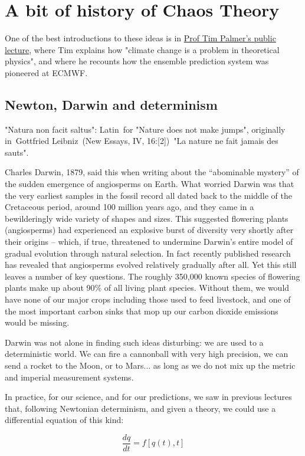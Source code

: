 \section{A bit of history of Chaos Theory}
One of the best introductions to these ideas is in \href{https://www.youtube.com/watch?v=w-IHJbzRVVU}{Prof Tim Palmer's public lecture}, where Tim explains how "climate change is a problem in theoretical physics", and where he recounts how the ensemble prediction system was pioneered at ECMWF.


\subsection{Newton, Darwin and determinism}
"Natura non facit saltus": Latin for "Nature does not make jumps", originally in Gottfried Leibniz (New Essays, IV, 16:[2]) "La nature ne fait jamais des sauts".

Charles Darwin, 1879, said this when writing about the “abominable mystery” of the sudden emergence of angiosperms on Earth.
What worried Darwin was that the very earliest samples in the fossil record all dated back to the middle of the Cretaceous period, around 100 million years ago, and they came in a bewilderingly wide variety of shapes and sizes. This suggested flowering plants (angiosperms) had experienced an explosive burst of diversity very shortly after their origins – which, if true, threatened to undermine Darwin's entire model of gradual evolution through natural selection.
In fact recently published research has revealed that angiosperms evolved relatively gradually after all. Yet this still leaves a number of key questions. The roughly 350,000 known species of flowering plants make up about 90\% of all living plant species. Without them, we would have none of our major crops including those used to feed livestock, and one of the most important carbon sinks that mop up our carbon dioxide emissions would be missing. 

Darwin was not alone in finding such ideas disturbing: we are used to a deterministic world. We can fire a cannonball with very high precision, we can send a rocket to the Moon, or to Mars... as long as we do not mix up the metric and imperial measurement systems.

In practice, for our science, and for our predictions, we saw in previous lectures that, following Newtonian determinism, and given a theory, we could use a differential equation of this kind:

\begin{equation}
\frac{dq}{dt}=f[q(t),t]
\end{equation}

